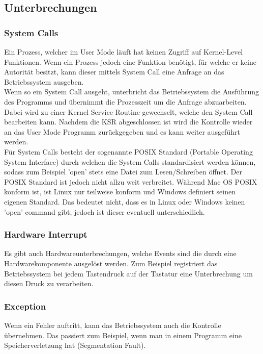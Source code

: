 \documentclass{article}
\begin{document}
	\subsection{Unterbrechungen}
	\subsubsection{System Calls}
	Ein Prozess, welcher im User Mode läuft hat keinen Zugriff auf Kernel-Level Funktionen. Wenn ein Prozess jedoch eine Funktion benötigt, für welche er keine Autorität besitzt, kann dieser mittels System Call eine Anfrage an das Betriebssystem ausgeben. \\
	Wenn so ein System Call ausgeht, unterbricht das Betriebssystem die Ausführung des Programms und übernimmt die Prozesszeit um die Anfrage abzuarbeiten. Dabei wird zu einer Kernel Service Routine gewechselt, welche den System Call bearbeiten kann. Nachdem die KSR abgeschlossen ist wird die Kontrolle wieder an das User Mode Programm zurückgegeben und es kann weiter ausgeführt werden. \\
	Für System Calls besteht der sogenannte POSIX Standard (Portable Operating System Interface) durch welchen die System Calls standardisiert werden können, sodass zum Beispiel 'open' stets eine Datei zum Lesen/Schreiben öffnet. Der POSIX Standard ist jedoch nicht allzu weit verbreitet. Während Mac OS POSIX konform ist, ist Linux nur teilweise konform und Windows definiert seinen eigenen Standard. Das bedeutet nicht, dass es in Linux oder Windows keinen 'open' command gibt, jedoch ist dieser eventuell unterschiedlich.
	\subsubsection{Hardware Interrupt}
	Es gibt auch Hardwareunterbrechungen, welche Events sind die durch eine Hardwarekomponente ausgelöst werden. Zum Beispiel registriert das Betriebssystem bei jedem Tastendruck auf der Tastatur eine Unterbrechung um diesen Druck zu verarbeiten.
	\subsubsection{Exception}
	Wenn ein Fehler auftritt, kann das Betriebssystem auch die Kontrolle übernehmen. Das passiert zum Beispiel, wenn man in einem Programm eine Speicherverletzung hat (Segmentation Fault).
\end{document}

